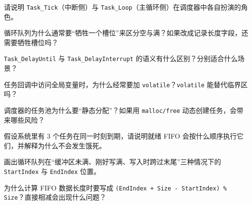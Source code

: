\begin{problemset}
\item 请说明 \texttt{Task\_Tick}（中断侧）与 \texttt{Task\_Loop}（主循环侧）在调度器中各自扮演的角色。
\item 循环队列为什么通常要“牺牲一个槽位”来区分空与满？如果改成记录长度字段，还需要牺牲槽位吗？
\item \texttt{Task\_DelayUntil} 与 \texttt{Task\_DelayInterrupt} 的语义有什么区别？分别适合什么场景？
\item 任务回调中访问全局变量时，为什么经常要加 \texttt{volatile}？\texttt{volatile} 能替代临界区吗？
\item 调度器的任务池为什么要“静态分配”？如果用 \texttt{malloc/free} 动态创建任务，会带来哪些风险？
\item 假设系统里有 3 个任务在同一时刻到期，请说明就绪 FIFO 会按什么顺序执行它们，并解释为什么不会发生饿死。
\item 画出循环队列在“缓冲区未满、刚好写满、写入时跨过末尾”三种情况下的 \texttt{StartIndex} 与 \texttt{EndIndex} 位置。
\item 为什么计算 FIFO 数据长度时要写成 \texttt{(EndIndex + Size - StartIndex) \% Size}？直接相减会出现什么问题？
\end{problemset}
